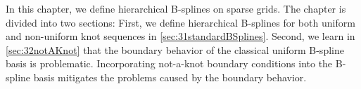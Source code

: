 In this chapter, we define hierarchical B-splines on sparse grids.
The chapter is divided into two sections:
First, we define hierarchical B-splines for both
uniform and non-uniform knot sequences in \cref{sec:31standardBSplines}.
Second, we learn in \cref{sec:32notAKnot} that the boundary behavior
of the classical uniform B-spline basis is problematic.
Incorporating not-a-knot boundary conditions into the B-spline basis
mitigates the problems caused by the boundary behavior.






\cleardoublepage
